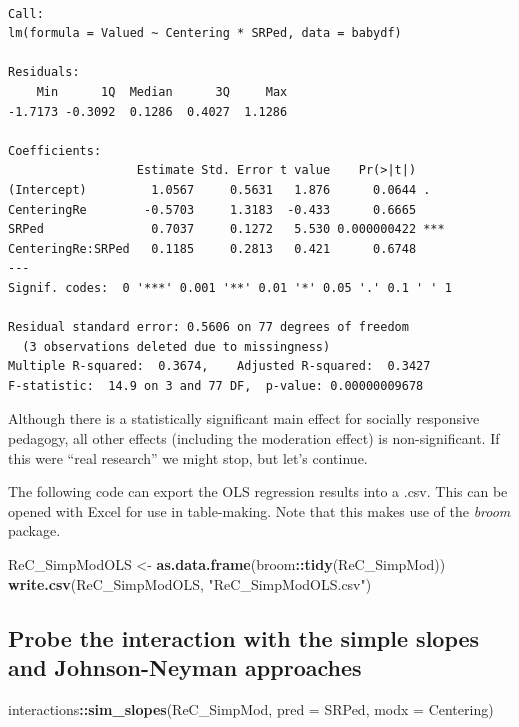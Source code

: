 \documentclass[
  11pt,
]{book}
\newenvironment{Shaded}{\begin{snugshade}}{\end{snugshade}}
\newcommand{\AttributeTok}[1]{\textcolor[rgb]{0.27,0.27,0.27}{#1}}
\newcommand{\FunctionTok}[1]{\textcolor[rgb]{0.27,0.27,0.27}{\textbf{#1}}}
\newcommand{\NormalTok}[1]{#1}
\newcommand{\OtherTok}[1]{\textcolor[rgb]{0.37,0.37,0.37}{#1}}
\newcommand{\SpecialCharTok}[1]{\textcolor[rgb]{0.43,0.43,0.43}{\textbf{#1}}}
\newcommand{\StringTok}[1]{\textcolor[rgb]{0.5,0.5,0.5}{#1}}
\begin{document}
\begin{verbatim}

Call:
lm(formula = Valued ~ Centering * SRPed, data = babydf)

Residuals:
    Min      1Q  Median      3Q     Max 
-1.7173 -0.3092  0.1286  0.4027  1.1286 

Coefficients:
                  Estimate Std. Error t value    Pr(>|t|)    
(Intercept)         1.0567     0.5631   1.876      0.0644 .  
CenteringRe        -0.5703     1.3183  -0.433      0.6665    
SRPed               0.7037     0.1272   5.530 0.000000422 ***
CenteringRe:SRPed   0.1185     0.2813   0.421      0.6748    
---
Signif. codes:  0 '***' 0.001 '**' 0.01 '*' 0.05 '.' 0.1 ' ' 1

Residual standard error: 0.5606 on 77 degrees of freedom
  (3 observations deleted due to missingness)
Multiple R-squared:  0.3674,    Adjusted R-squared:  0.3427 
F-statistic:  14.9 on 3 and 77 DF,  p-value: 0.00000009678
\end{verbatim}

Although there is a statistically significant main effect for socially responsive pedagogy, all other effects (including the moderation effect) is non-significant. If this were ``real research'' we might stop, but let's continue.

The following code can export the OLS regression results into a .csv. This can be opened with Excel for use in table-making. Note that this makes use of the \emph{broom} package.

\begin{Shaded}
\begin{Highlighting}[]
\NormalTok{ReC\_SimpModOLS }\OtherTok{\textless{}{-}} \FunctionTok{as.data.frame}\NormalTok{(broom}\SpecialCharTok{::}\FunctionTok{tidy}\NormalTok{(ReC\_SimpMod))}
\FunctionTok{write.csv}\NormalTok{(ReC\_SimpModOLS, }\StringTok{"ReC\_SimpModOLS.csv"}\NormalTok{)}
\end{Highlighting}
\end{Shaded}

\hypertarget{probe-the-interaction-with-the-simple-slopes-and-johnson-neyman-approaches}{%
\subsection*{Probe the interaction with the simple slopes and Johnson-Neyman approaches}\label{probe-the-interaction-with-the-simple-slopes-and-johnson-neyman-approaches}}


\begin{Shaded}
\begin{Highlighting}[]
\NormalTok{interactions}\SpecialCharTok{::}\FunctionTok{sim\_slopes}\NormalTok{(ReC\_SimpMod, }\AttributeTok{pred =}\NormalTok{ SRPed, }\AttributeTok{modx =}\NormalTok{ Centering)}
\end{Highlighting}
\end{Shaded}
\end{document}
